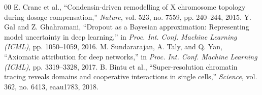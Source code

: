 \documentclass[conference]{IEEEtran}
\begin{document}
\begin{thebibliography}{00}
 E. Crane et al., ``Condensin-driven remodelling of X chromosome topology during dosage compensation,'' \textit{Nature}, vol. 523, no. 7559, pp. 240--244, 2015.
 Y. Gal and Z. Ghahramani, ``Dropout as a Bayesian approximation: Representing model uncertainty in deep learning,'' in \textit{Proc. Int. Conf. Machine Learning (ICML)}, pp. 1050--1059, 2016.
 M. Sundararajan, A. Taly, and Q. Yan, ``Axiomatic attribution for deep networks,'' in \textit{Proc. Int. Conf. Machine Learning (ICML)}, pp. 3319--3328, 2017.
 B. Bintu et al., ``Super-resolution chromatin tracing reveals domains and cooperative interactions in single cells,'' \textit{Science}, vol. 362, no. 6413, eaau1783, 2018.
\end{thebibliography}
\end{document}
